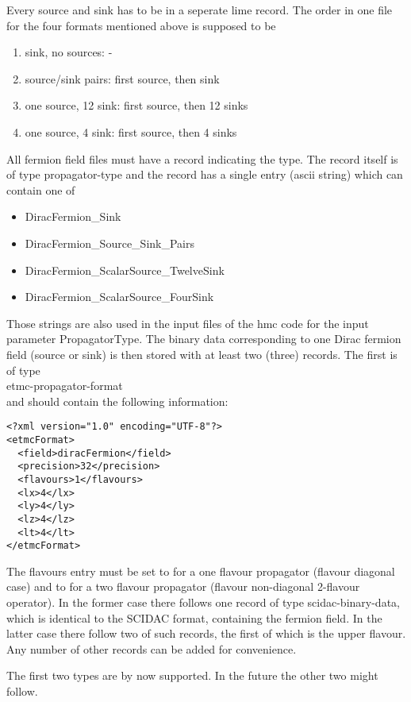Every source and sink has to be in a seperate lime record. The order
in one file for the four formats mentioned above is supposed to be 
\begin{enumerate}
\item sink, no sources: -
\item source/sink pairs: first source, then sink
\item one source, 12 sink: first source, then 12 sinks
\item one source, 4 sink: first source, then 4 sinks
\end{enumerate}
All fermion field files must have a record indicating the type. The
record itself is of type {\ttfamily propagator-type} and the
record has a single entry (ascii string) which can contain one of 
\begin{itemize}
\item {\ttfamily DiracFermion\_Sink}
\item {\ttfamily DiracFermion\_Source\_Sink\_Pairs}
\item {\ttfamily DiracFermion\_ScalarSource\_TwelveSink}
\item {\ttfamily DiracFermion\_ScalarSource\_FourSink}
\end{itemize}
Those strings are also used in the input files of the hmc code for the
input parameter {\ttfamily PropagatorType}.
The binary data corresponding to one Dirac fermion field (source or
sink) is then stored with at least two (three) records. The first is
of type \\
{\ttfamily etmc-propagator-format} \\
and should contain the following information:
\begin{verbatim}
<?xml version="1.0" encoding="UTF-8"?>
<etmcFormat>
  <field>diracFermion</field>
  <precision>32</precision>
  <flavours>1</flavours>
  <lx>4</lx>
  <ly>4</ly>
  <lz>4</lz>
  <lt>4</lt>
</etmcFormat>
\end{verbatim}
The {\ttfamily flavours} entry must be set to {} for a one
flavour propagator (flavour diagonal case) and to {} for a two
flavour propagator (flavour non-diagonal 2-flavour operator). In the
former case there follows one record of type
{\ttfamily scidac-binary-data}, which is identical to the SCIDAC
format, containing the fermion field. In the latter case there follow
two of such records, the first of which is the upper flavour.
Any number of other records can be added for convenience.

The first two types are by now supported. In the future the other two
might follow.

